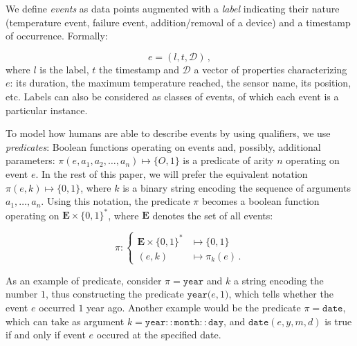 \documentclass[entropy,article,submit,moreauthors,pdftex]{Definitions/mdpi}
\begin{document}
We define \emph{events} as data points augmented with a \emph{label} indicating their nature (temperature event, failure event, addition/removal of a device) and a timestamp of occurrence. Formally:

\begin{equation}
    \label{eq:event}
    e = (l, t,\mathcal{D})\,,
\end{equation}
where $l$ is the label, $t$ the timestamp and $\mathcal{D}$ a vector of properties characterizing $e$: its duration, the maximum temperature reached, the sensor name, its position, etc. Labels can also be considered as classes of events, of which each event is a particular instance.

To model how humans are able to describe events by using qualifiers, we use \emph{predicates}: Boolean functions operating on events and, possibly, additional parameters: $\pi(e, a_1, a_2, \dots, a_n) \mapsto \{O,1\}$ is a predicate of arity $n$ operating on event $e$. In the rest of this paper, we will prefer the equivalent notation $\pi(e, k) \mapsto \{0,1\}$, where $k$ is a binary string encoding the sequence of arguments $a_1, \dots, a_n$. Using this notation, the predicate $\pi$ becomes a boolean function operating on $\mathbf{E} \times \{0,1\}^*$, where $\mathbf{E}$ denotes the set of all events:

\begin{equation}
    \label{eq:predicate}
    \pi : \begin{cases}
        \mathbf{E}\times \{0,1\}^{*} & \mapsto \{0,1\}    \\
        (e, k)                        & \mapsto \pi_{k}(e)\,.
    \end{cases}
\end{equation}

As an example of predicate, consider $\pi = \mathtt{year}$ and $k$ a string encoding the number $1$, thus
constructing the predicate $\mathtt{year(}e, 1\mathtt{)}$, which tells whether
the event $e$ occurred $1$ year ago. Another example would be the predicate $\pi = \mathtt{date}$, which can take as argument $k=\mathtt{year}::\mathtt{month}::\mathtt{day}$, and $\mathtt{date}(e, y, m, d)$ is true if and only if event $e$ occured at the specified date.
\end{document}
